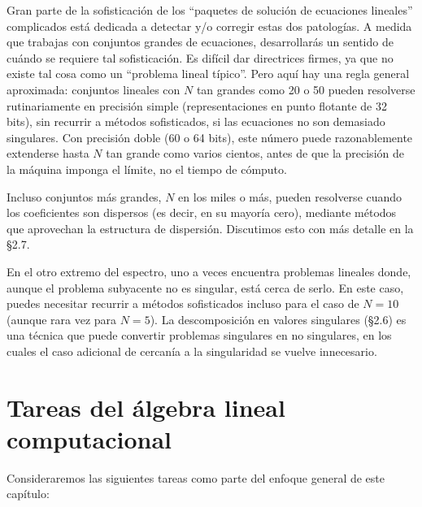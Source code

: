 \documentclass[10pt,a4paper]{book}
\begin{document}
\medskip

Gran parte de la sofisticación de los “paquetes de solución de ecuaciones lineales” complicados está dedicada a detectar y/o corregir estas dos patologías. A medida que trabajas con conjuntos grandes de ecuaciones, desarrollarás un sentido de cuándo se requiere tal sofisticación. Es difícil dar directrices firmes, ya que no existe tal cosa como un “problema lineal típico”. Pero aquí hay una regla general aproximada: conjuntos lineales con \( N \) tan grandes como 20 o 50 pueden resolverse rutinariamente en precisión simple (representaciones en punto flotante de 32 bits), sin recurrir a métodos sofisticados, si las ecuaciones no son demasiado singulares. Con precisión doble (60 o 64 bits), este número puede razonablemente extenderse hasta \( N \) tan grande como varios cientos, antes de que la precisión de la máquina imponga el límite, no el tiempo de cómputo.

\medskip

Incluso conjuntos más grandes, \( N \) en los miles o más, pueden resolverse cuando los coeficientes son dispersos (es decir, en su mayoría cero), mediante métodos que aprovechan la estructura de dispersión. Discutimos esto con más detalle en la \S2.7.

\medskip

En el otro extremo del espectro, uno a veces encuentra problemas lineales donde, aunque el problema subyacente no es singular, está cerca de serlo. En este caso, puedes necesitar recurrir a métodos sofisticados incluso para el caso de \( N = 10 \) (aunque rara vez para \( N = 5 \)). La descomposición en valores singulares (\S2.6) es una técnica que puede convertir problemas singulares en no singulares, en los cuales el caso adicional de cercanía a la singularidad se vuelve innecesario.

\section{Tareas del álgebra lineal computacional}

Consideraremos las siguientes tareas como parte del enfoque general de este capítulo:
\end{document}
